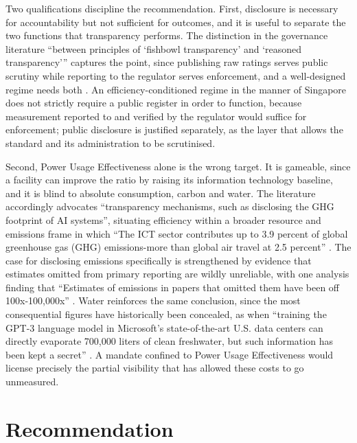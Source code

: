 Two qualifications discipline the recommendation. First, disclosure is necessary for accountability but not sufficient for outcomes, and it is useful to separate the two functions that transparency performs. The distinction in the governance literature \enquote{between principles of \enquote{fishbowl transparency} and \enquote{reasoned transparency}} captures the point, since publishing raw ratings serves public scrutiny while reporting to the regulator serves enforcement, and a well-designed regime needs both \autocite{coglianeseTransparencyAlgorithmicGovernance2019a}. An efficiency-conditioned regime in the manner of Singapore does not strictly require a public register in order to function, because measurement reported to and verified by the regulator would suffice for enforcement; public disclosure is justified separately, as the layer that allows the standard and its administration to be scrutinised.

Second, Power Usage Effectiveness alone is the wrong target. It is gameable, since a facility can improve the ratio by raising its information technology baseline, and it is blind to absolute consumption, carbon and water. The literature accordingly advocates \enquote{transparency mechanisms, such as disclosing the GHG footprint of AI systems}, situating efficiency within a broader resource and emissions frame in which \enquote{The ICT sector contributes up to 3.9 percent of global greenhouse gas (GHG) emissions-more than global air travel at 2.5 percent} \autocite{hackerSustainableAIRegulation2024}. The case for disclosing emissions specifically is strengthened by evidence that estimates omitted from primary reporting are wildly unreliable, with one analysis finding that \enquote{Estimates of emissions in papers that omitted them have been off 100x-100,000x} \autocite{pattersonCarbonFootprintMachine2022a}. Water reinforces the same conclusion, since the most consequential figures have historically been concealed, as when \enquote{training the GPT-3 language model in Microsoft's state-of-the-art U.S. data centers can directly evaporate 700,000 liters of clean freshwater, but such information has been kept a secret} \autocite{liMakingAILess2025}. A mandate confined to Power Usage Effectiveness would license precisely the partial visibility that has allowed these costs to go unmeasured.

\section{Recommendation}
\label{sec:supp:pue:rec}

